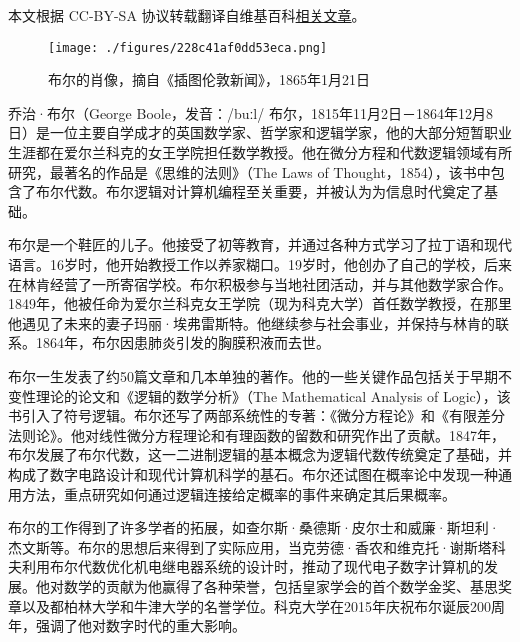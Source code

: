 
本文根据 CC-BY-SA 协议转载翻译自维基百科\href{https://en.wikipedia.org/wiki/George_Boole#}{相关文章}。

\begin{figure}[ht]
\centering
\texttt{[image: ./figures/228c41af0dd53eca.png]}
\caption{布尔的肖像，摘自《插图伦敦新闻》，1865年1月21日} \label{fig_George_1}
\end{figure}
乔治·布尔（George Boole，发音：/buːl/ 布尔，1815年11月2日－1864年12月8日）是一位主要自学成才的英国数学家、哲学家和逻辑学家，他的大部分短暂职业生涯都在爱尔兰科克的女王学院担任数学教授。他在微分方程和代数逻辑领域有所研究，最著名的作品是《思维的法则》（The Laws of Thought，1854），该书中包含了布尔代数。布尔逻辑对计算机编程至关重要，并被认为为信息时代奠定了基础。

布尔是一个鞋匠的儿子。他接受了初等教育，并通过各种方式学习了拉丁语和现代语言。16岁时，他开始教授工作以养家糊口。19岁时，他创办了自己的学校，后来在林肯经营了一所寄宿学校。布尔积极参与当地社团活动，并与其他数学家合作。1849年，他被任命为爱尔兰科克女王学院（现为科克大学）首任数学教授，在那里他遇见了未来的妻子玛丽·埃弗雷斯特。他继续参与社会事业，并保持与林肯的联系。1864年，布尔因患肺炎引发的胸膜积液而去世。

布尔一生发表了约50篇文章和几本单独的著作。他的一些关键作品包括关于早期不变性理论的论文和《逻辑的数学分析》（The Mathematical Analysis of Logic），该书引入了符号逻辑。布尔还写了两部系统性的专著：《微分方程论》和《有限差分法则论》。他对线性微分方程理论和有理函数的留数和研究作出了贡献。1847年，布尔发展了布尔代数，这一二进制逻辑的基本概念为逻辑代数传统奠定了基础，并构成了数字电路设计和现代计算机科学的基石。布尔还试图在概率论中发现一种通用方法，重点研究如何通过逻辑连接给定概率的事件来确定其后果概率。

布尔的工作得到了许多学者的拓展，如查尔斯·桑德斯·皮尔士和威廉·斯坦利·杰文斯等。布尔的思想后来得到了实际应用，当克劳德·香农和维克托·谢斯塔科夫利用布尔代数优化机电继电器系统的设计时，推动了现代电子数字计算机的发展。他对数学的贡献为他赢得了各种荣誉，包括皇家学会的首个数学金奖、基思奖章以及都柏林大学和牛津大学的名誉学位。科克大学在2015年庆祝布尔诞辰200周年，强调了他对数字时代的重大影响。
